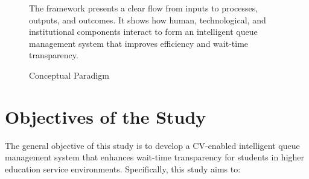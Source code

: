 \documentclass{research}
\begin{document}
\begin{figure}[htbp]
{\begin{minipage}{\textwidth}
\end{minipage}
}

\vspace{0.8em}

\caption{Conceptual Paradigm}
\label{fig:conceptual-framework}

\vspace{0.8em}

\noindent
The framework presents a clear flow from inputs to processes, outputs, and outcomes. It shows how human, technological, and institutional components interact to form an intelligent queue management system that improves efficiency and wait-time transparency.
\end{figure}

\section{Objectives of the Study}

The general objective of this study is to develop a CV-enabled intelligent queue management system that enhances wait-time transparency for students in higher education service environments. Specifically, this study aims to:
\end{document}
